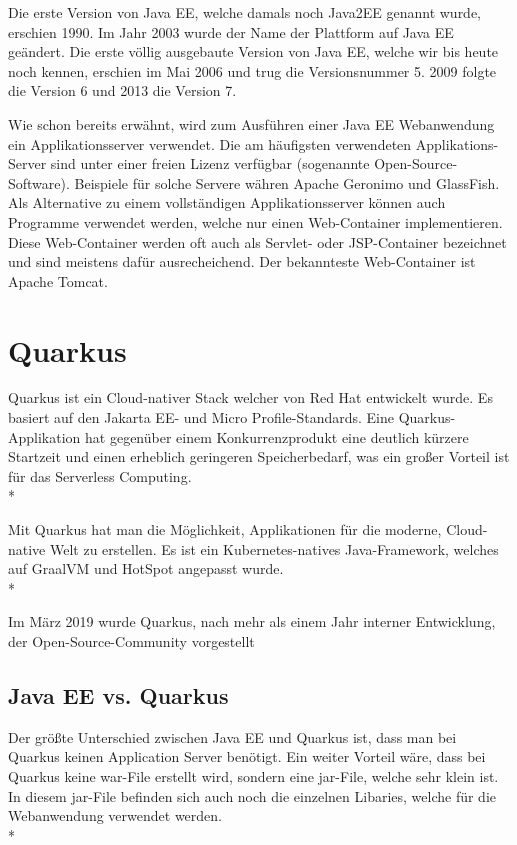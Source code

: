 Die erste Version von Java EE, welche damals noch Java2EE genannt wurde, erschien 1990. Im Jahr 2003 wurde der Name der Plattform auf Java EE geändert.
Die erste völlig ausgebaute Version von Java EE, welche wir bis heute noch kennen, erschien im Mai 2006 und trug die Versionsnummer 5. 
2009 folgte die Version 6 und 2013 die Version 7.

Wie schon bereits erwähnt, wird zum Ausführen einer Java EE Webanwendung ein Applikationsserver verwendet. 
Die am häufigsten verwendeten Applikations-Server sind unter einer freien Lizenz verfügbar (sogenannte Open-Source-Software).
Beispiele für solche Servere währen Apache Geronimo und GlassFish. 
Als Alternative zu einem vollständigen Applikationsserver können auch Programme verwendet werden, welche nur einen Web-Container implementieren.
Diese Web-Container werden oft auch als Servlet- oder JSP-Container bezeichnet und sind meistens dafür ausrecheichend. Der bekannteste Web-Container ist Apache Tomcat.

\cite{JavaEE}

\section{Quarkus}
\author{David Ignjatovic} 

Quarkus ist ein Cloud-nativer Stack welcher von Red Hat entwickelt wurde. Es basiert auf den Jakarta EE- und Micro Profile-Standards. 
Eine Quarkus-Applikation hat gegenüber einem Konkurrenzprodukt eine deutlich kürzere Startzeit und einen erheblich geringeren Speicherbedarf, was ein großer Vorteil ist für das Serverless Computing.  \cite{Quarkus} \\*

Mit Quarkus hat man die Möglichkeit, Applikationen für die moderne, Cloud-native Welt zu erstellen. 
Es ist ein Kubernetes-natives Java-Framework, welches auf GraalVM und HotSpot angepasst wurde. \\*   

Im März 2019 wurde Quarkus, nach mehr als einem Jahr interner Entwicklung, der Open-Source-Community vorgestellt

\subsection{Java EE vs. Quarkus}
\author{David Ignjatovic} 

Der größte Unterschied zwischen Java EE und Quarkus ist, dass man bei Quarkus keinen Application Server benötigt. 
Ein weiter Vorteil wäre, dass bei Quarkus keine war-File erstellt wird, sondern eine jar-File, welche sehr klein ist. 
In diesem jar-File befinden sich auch noch die einzelnen Libaries, welche für die Webanwendung verwendet werden. \\*

